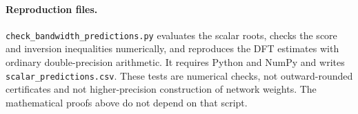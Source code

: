 \documentclass[11pt]{article}
\theoremstyle{definition}\newtheorem{definition}[theorem]{Definition}
\theoremstyle{remark}\newtheorem{remark}[theorem]{Remark}
\numberwithin{equation}{section}
\begin{document}
\paragraph{Reproduction files.}
\texttt{check\_bandwidth\_predictions.py} evaluates the scalar roots, checks the score and inversion inequalities numerically, and reproduces the DFT estimates with ordinary double-precision arithmetic. It requires Python and NumPy and writes \texttt{scalar\_predictions.csv}. These tests are numerical checks, not outward-rounded certificates and not higher-precision construction of network weights. The mathematical proofs above do not depend on that script.
\end{document}
